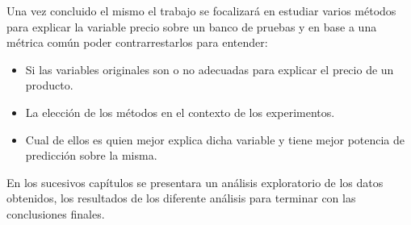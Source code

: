 Una vez concluido el mismo el trabajo se focalizará en estudiar varios métodos para explicar la variable precio sobre un banco de pruebas y en base a una métrica común poder contrarrestarlos para entender:


\begin{itemize}
    	\item Si las variables originales son o no adecuadas para explicar el precio de un producto.
    	\item La elección de los métodos en el contexto de los experimentos.
        \item Cual de ellos es quien mejor explica dicha variable y tiene mejor potencia de predicción sobre la misma.
\end{itemize}



En los sucesivos capítulos se presentara un análisis exploratorio de los datos obtenidos, los resultados de los diferente análisis para terminar con las conclusiones finales.






